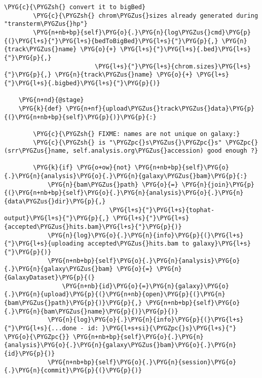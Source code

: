 \begin{Verbatim}[commandchars=\\\{\}]
        \PYG{c}{\PYGZsh{} convert it to bigBed}
        \PYG{c}{\PYGZsh{} chrom\PYGZus{}sizes already generated during "transterm\PYGZus{}hp"}
        \PYG{n+nb+bp}{self}\PYG{o}{.}\PYG{n}{log\PYGZus{}cmd}\PYG{p}{(}\PYG{l+s}{"}\PYG{l+s}{bedToBigBed}\PYG{l+s}{"}\PYG{p}{,} \PYG{n}{track\PYGZus{}name} \PYG{o}{+} \PYG{l+s}{"}\PYG{l+s}{.bed}\PYG{l+s}{"}\PYG{p}{,}
                         \PYG{l+s}{"}\PYG{l+s}{chrom.sizes}\PYG{l+s}{"}\PYG{p}{,} \PYG{n}{track\PYGZus{}name} \PYG{o}{+} \PYG{l+s}{"}\PYG{l+s}{.bigbed}\PYG{l+s}{"}\PYG{p}{)}

    \PYG{n+nd}{@stage}
    \PYG{k}{def} \PYG{n+nf}{upload\PYGZus{}track\PYGZus{}data}\PYG{p}{(}\PYG{n+nb+bp}{self}\PYG{p}{)}\PYG{p}{:}

        \PYG{c}{\PYGZsh{} FIXME: names are not unique on galaxy:}
        \PYG{c}{\PYGZsh{} is "\PYGZpc{}s\PYGZus{}\PYGZpc{}s" \PYGZpc{} (srr\PYGZus{}name, self.analysis.org\PYGZus{}accession) good enough ?}

        \PYG{k}{if} \PYG{o+ow}{not} \PYG{n+nb+bp}{self}\PYG{o}{.}\PYG{n}{analysis}\PYG{o}{.}\PYG{n}{galaxy\PYGZus{}bam}\PYG{p}{:}
            \PYG{n}{bam\PYGZus{}path} \PYG{o}{=} \PYG{n}{join}\PYG{p}{(}\PYG{n+nb+bp}{self}\PYG{o}{.}\PYG{n}{analysis}\PYG{o}{.}\PYG{n}{data\PYGZus{}dir}\PYG{p}{,} 
                             \PYG{l+s}{"}\PYG{l+s}{tophat-output}\PYG{l+s}{"}\PYG{p}{,} \PYG{l+s}{"}\PYG{l+s}{accepted\PYGZus{}hits.bam}\PYG{l+s}{"}\PYG{p}{)}
            \PYG{n}{log}\PYG{o}{.}\PYG{n}{info}\PYG{p}{(}\PYG{l+s}{"}\PYG{l+s}{uploading accepted\PYGZus{}hits.bam to galaxy}\PYG{l+s}{"}\PYG{p}{)}
            \PYG{n+nb+bp}{self}\PYG{o}{.}\PYG{n}{analysis}\PYG{o}{.}\PYG{n}{galaxy\PYGZus{}bam} \PYG{o}{=} \PYG{n}{GalaxyDataset}\PYG{p}{(}
                \PYG{n+nb}{id}\PYG{o}{=}\PYG{n}{galaxy}\PYG{o}{.}\PYG{n}{upload}\PYG{p}{(}\PYG{n+nb}{open}\PYG{p}{(}\PYG{n}{bam\PYGZus{}path}\PYG{p}{)}\PYG{p}{,} \PYG{n+nb+bp}{self}\PYG{o}{.}\PYG{n}{bam\PYGZus{}name}\PYG{p}{)}\PYG{p}{)}
            \PYG{n}{log}\PYG{o}{.}\PYG{n}{info}\PYG{p}{(}\PYG{l+s}{"}\PYG{l+s}{...done - id: }\PYG{l+s+si}{\PYGZpc{}s}\PYG{l+s}{"} \PYG{o}{\PYGZpc{}} \PYG{n+nb+bp}{self}\PYG{o}{.}\PYG{n}{analysis}\PYG{o}{.}\PYG{n}{galaxy\PYGZus{}bam}\PYG{o}{.}\PYG{n}{id}\PYG{p}{)}
            \PYG{n+nb+bp}{self}\PYG{o}{.}\PYG{n}{session}\PYG{o}{.}\PYG{n}{commit}\PYG{p}{(}\PYG{p}{)}


\end{Verbatim}
